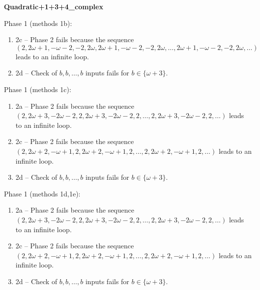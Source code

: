 \begin{exmp}
\label{ex:compareAM}

\textbf{Quadratic+1+3+4\_complex}

Phase 1 (methods 1b):
\begin{enumerate}[ ]
\item  2c -- Phase 2   fails because  the sequence $(2,\allowbreak  2\omega + 1,\allowbreak  -\omega - 2,\allowbreak  -2,\allowbreak  2\omega,\allowbreak  2\omega + 1,\allowbreak  -\omega - 2,\allowbreak  -2,\allowbreak  2\omega,\allowbreak  \dots ,\allowbreak  2\omega + 1,\allowbreak  -\omega - 2,\allowbreak  -2,\allowbreak  2\omega,\allowbreak  \dots)$ leads to an infinite loop.
\item  2d -- Check of $b,\allowbreak b,\allowbreak \dots,\allowbreak b$ inputs fails for $b\in \{\omega + 3\}$.
\end{enumerate}


Phase 1 (methods 1c):
\begin{enumerate}[ ]
\item  2a -- Phase 2   fails because  the sequence $(2,\allowbreak  2\omega + 3,\allowbreak  -2\omega - 2,\allowbreak  2,\allowbreak  2\omega + 3,\allowbreak  -2\omega - 2,\allowbreak  2,\allowbreak  \dots ,\allowbreak 2,\allowbreak  2\omega + 3,\allowbreak  -2\omega - 2,\allowbreak  2,\allowbreak  \dots)$ leads to an infinite loop.
\item  2c -- Phase 2   fails because  the sequence $(2,\allowbreak  2\omega + 2,\allowbreak  -\omega + 1,\allowbreak  2,\allowbreak  2\omega + 2,\allowbreak  -\omega + 1,\allowbreak  2,\allowbreak  \dots ,\allowbreak 2,\allowbreak  2\omega + 2,\allowbreak  -\omega + 1,\allowbreak  2,\allowbreak  \dots)$ leads to an infinite loop.
\item  2d -- Check of $b,\allowbreak b,\allowbreak \dots,\allowbreak b$ inputs fails for $b\in \{\omega + 3\}$.
\end{enumerate}


Phase 1 (methods 1d,\allowbreak  1e):
\begin{enumerate}[ ]
\item  2a -- Phase 2   fails because  the sequence $(2,\allowbreak  2\omega + 3,\allowbreak  -2\omega - 2,\allowbreak  2,\allowbreak  2\omega + 3,\allowbreak  -2\omega - 2,\allowbreak  2,\allowbreak  \dots ,\allowbreak 2,\allowbreak  2\omega + 3,\allowbreak  -2\omega - 2,\allowbreak  2,\allowbreak  \dots)$ leads to an infinite loop.
\item  2c -- Phase 2   fails because  the sequence $(2,\allowbreak  2\omega + 2,\allowbreak  -\omega + 1,\allowbreak  2,\allowbreak  2\omega + 2,\allowbreak  -\omega + 1,\allowbreak  2,\allowbreak  \dots ,\allowbreak 2,\allowbreak  2\omega + 2,\allowbreak  -\omega + 1,\allowbreak  2,\allowbreak  \dots)$ leads to an infinite loop.
\item  2d -- Check of $b,\allowbreak b,\allowbreak \dots,\allowbreak b$ inputs fails for $b\in \{\omega + 3\}$.
\end{enumerate}



\end{exmp}
